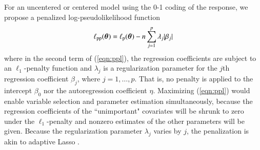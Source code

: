 \documentclass[authoryear,review, 12pt]{elsarticle}
\begin{document}
For an uncentered or centered model using the 0-1 coding of the response, we propose a penalized log-pseudolikelihood function 
\begin{eqnarray}
\ell_{\rm pp}(\bm{\theta})= \ell_{\rm p}(\bm{\theta})-n\sum_{j=1}^{p}\lambda_j|\beta_j|
\label{eqn:ppl}
\end{eqnarray}
where in the second term of (\ref{eqn:ppl}), the regression coefficients are subject to an $\ell_1$-penalty function and  $\lambda_j$ is a regularization parameter for the $j$th regression coefficient $\beta_j$, where $j=1,\ldots,p$.  That is, no penalty is applied to the intercept $\beta_0$ nor the autoregression coefficient $\eta$.  Maximizing (\ref{eqn:ppl}) would enable variable selection and parameter estimation simultaneously, because the regression coefficients of the ``unimportant" covariates will be shrunk to zero under the $\ell_1$-penalty and nonzero estimates of the other parameters will be given.  Because the regularization parameter $\lambda_j$ varies by $j$, the penalization is akin to adaptive Lasso \citep{zou06}.
\end{document}
